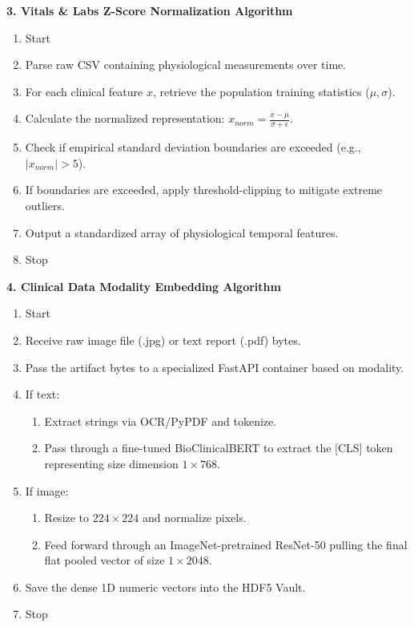 \documentclass{fisatprojectfinal}
\begin{document}
\textbf{3. Vitals \& Labs Z-Score Normalization Algorithm}
\begin{enumerate}
    \item Start
    \item Parse raw CSV containing physiological measurements over time.
    \item For each clinical feature $x$, retrieve the population training statistics ($\mu, \sigma$).
    \item Calculate the normalized representation: $x_{norm} = \frac{x - \mu}{\sigma + \epsilon}$.
    \item Check if empirical standard deviation boundaries are exceeded (e.g., $|x_{norm}| > 5$).
    \item If boundaries are exceeded, apply threshold-clipping to mitigate extreme outliers.
    \item Output a standardized array of physiological temporal features.
    \item Stop
\end{enumerate}

\textbf{4. Clinical Data Modality Embedding Algorithm}
\begin{enumerate}
    \item Start
    \item Receive raw image file (.jpg) or text report (.pdf) bytes.
    \item Pass the artifact bytes to a specialized FastAPI container based on modality.
    \item If text:
    \begin{enumerate}
        \item Extract strings via OCR/PyPDF and tokenize.
        \item Pass through a fine-tuned BioClinicalBERT to extract the [CLS] token representing size dimension $1 \times 768$.
    \end{enumerate}
    \item If image:
    \begin{enumerate}
        \item Resize to $224 \times 224$ and normalize pixels.
        \item Feed forward through an ImageNet-pretrained ResNet-50 pulling the final flat pooled vector of size $1 \times 2048$.
    \end{enumerate}
    \item Save the dense 1D numeric vectors into the HDF5 Vault.
    \item Stop
\end{enumerate}
\end{document}
